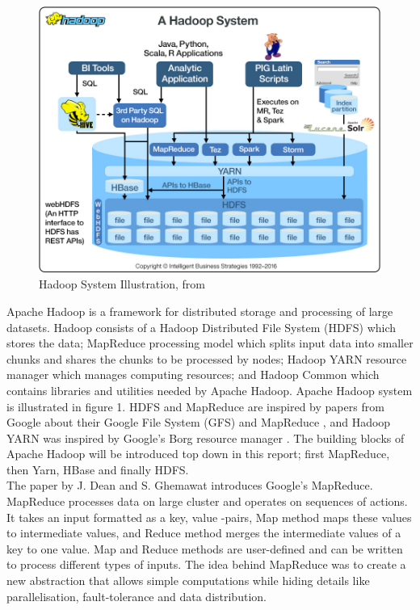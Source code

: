 \documentclass{article}
\theoremstyle{definition}
\begin{document}
\begin{figure}[H]
\centering
\includegraphics[scale=0.4]{SystemIllustration}
\caption{Hadoop System Illustration, from \cite{ibmhadoop}}
\end{figure}

Apache Hadoop is a framework for distributed storage and processing of large datasets. Hadoop consists of a Hadoop Distributed File System (HDFS) which stores the data; MapReduce processing model which splits input data into smaller chunks and shares the chunks to be processed by nodes; Hadoop YARN resource manager which manages computing resources; and Hadoop Common which contains libraries and utilities needed by Apache Hadoop. Apache Hadoop system is illustrated in figure 1. HDFS and MapReduce are inspired by papers from Google about their Google File System (GFS) \cite{Ghemawat2003} and MapReduce \cite{Dean}, and Hadoop YARN was inspired by Google's Borg resource manager \cite{Verma}. The building blocks of Apache Hadoop will be introduced top down in this report; first MapReduce, then Yarn, HBase and finally HDFS. \\ 

The paper \cite{Dean} by J. Dean and S. Ghemawat introduces Google's MapReduce. MapReduce processes data on large cluster and operates on sequences of actions. It takes an input formatted as a key, value -pairs, Map method maps these values to intermediate values, and Reduce method merges the intermediate values of a key to one value. Map and Reduce methods are user-defined and can be written to process different types of inputs. The idea behind MapReduce was to create a new abstraction that allows simple computations while hiding details like parallelisation, fault-tolerance and data distribution. \\
\end{document}

